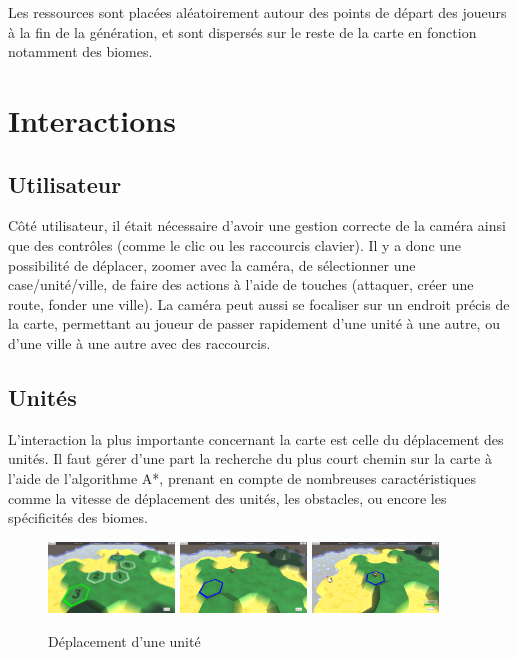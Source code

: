 \documentclass[12pt]{report}
\begin{document}
Les ressources sont placées aléatoirement autour des points de départ des
joueurs à la fin de la génération, et sont dispersés sur le reste de la carte
en fonction notamment des biomes.

\section{Interactions}

\subsection{Utilisateur}

Côté utilisateur, il était nécessaire d’avoir une gestion correcte de la caméra
ainsi que des contrôles (comme le clic ou les raccourcis clavier). Il y a donc
une possibilité de déplacer, zoomer avec la caméra, de sélectionner une
case/unité/ville, de faire des actions à l’aide de touches (attaquer, créer une
route, fonder une ville). La caméra peut aussi se focaliser sur un endroit
précis de la carte, permettant au joueur de passer rapidement d’une unité à une
autre, ou d’une ville à une autre avec des raccourcis.

\subsection{Unités}

L’interaction la plus importante concernant la carte est celle du déplacement
des unités. Il faut gérer d’une part la recherche du plus court chemin sur la
carte à l’aide de l’algorithme A*, prenant en compte de nombreuses
caractéristiques comme la vitesse de déplacement des unités, les obstacles, ou
encore les spécificités des biomes.

\begin{figure}[H]
    \centering
    \includegraphics[width=0.3\textwidth]{pathfinding1}
    \includegraphics[width=0.3\textwidth]{pathfinding2}
    \includegraphics[width=0.3\textwidth]{pathfinding3}
    \caption*{Déplacement d'une unité}
\end{figure}
\end{document}

